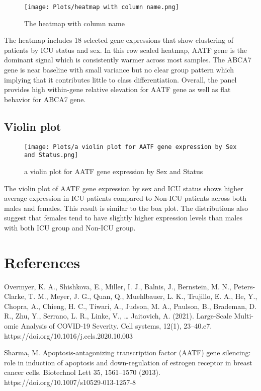\documentclass{article}
\begin{document}
\begin{figure}[H]
    \centering
    \texttt{[image: Plots/heatmap with column name.png]}
    \caption{The heatmap with column name}
    \label{fig:placeholder}
\end{figure}
The heatmap includes 18 selected gene expressions that show clustering of patients by ICU status and sex. In this row scaled heatmap, AATF gene is the dominant signal which is consistently warmer across most samples. The ABCA7 gene is near baseline with small variance but no clear group pattern which implying that it contributes little to class differentiation. Overall, the panel provides high within-gene relative elevation for AATF gene as well as flat behavior for ABCA7 gene.


\subsection{Violin plot}
\begin{figure}[H]
    \centering
    \texttt{[image: Plots/a violin plot for AATF gene expression by Sex and Status.png]}
    \caption{a violin plot for AATF gene expression by Sex and Status}
    \label{fig:placeholder}
\end{figure}
The violin plot of AATF gene expression by sex and ICU status shows higher average expression in ICU patients compared to Non-ICU patients across both males and females. This result is similar to the box plot. The distributions also suggest that females tend to have slightly higher expression levels than males with both ICU group and Non-ICU group.

\section{References}
Overmyer, K. A., Shishkova, E., Miller, I. J., Balnis, J., Bernstein, M. N., Peters-Clarke, T. M., Meyer, J. G., Quan, Q., Muehlbauer, L. K., Trujillo, E. A., He, Y., Chopra, A., Chieng, H. C., Tiwari, A., Judson, M. A., Paulson, B., Brademan, D. R., Zhu, Y., Serrano, L. R., Linke, V., … Jaitovich, A. (2021). Large-Scale Multi-omic Analysis of COVID-19 Severity. Cell systems, 12(1), 23–40.e7. https://doi.org/10.1016/j.cels.2020.10.003

Sharma, M. Apoptosis-antagonizing transcription factor (AATF) gene silencing: role in induction of apoptosis and down-regulation of estrogen receptor in breast cancer cells. Biotechnol Lett 35, 1561–1570 (2013). https://doi.org/10.1007/s10529-013-1257-8
\end{document}
